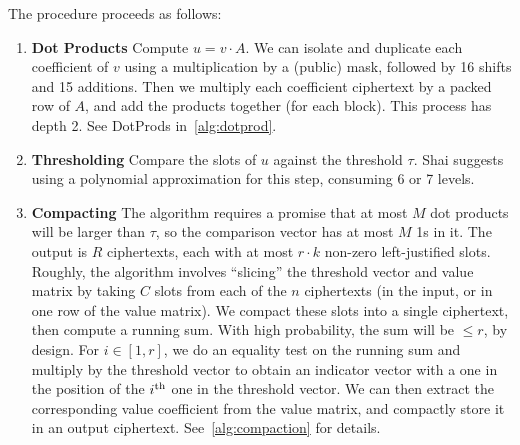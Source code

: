 \documentclass{article}
\begin{document}
	The procedure proceeds as follows:
	\begin{enumerate}
		\item \textbf{Dot Products} Compute $u=v\cdot A$. We can isolate and duplicate each coefficient of $v$ using a multiplication by a (public) mask, followed by 16 shifts and 15 additions. Then we multiply each coefficient ciphertext by a packed row of $A$, and add the products together (for each block). This process has depth 2. See \textrm{DotProds} in~\cref{alg:dotprod}.
		
		\item \textbf{Thresholding} Compare the slots of $u$ against the threshold $\tau$. Shai suggests using a polynomial approximation for this step, consuming 6 or 7 levels.
		
		\item \textbf{Compacting} The algorithm requires a promise that at most $M$ dot products will be larger than $\tau$, so the comparison vector has at most $M$ 1s in it. The output is $R$ ciphertexts, each with at most $r\cdot k$ non-zero left-justified slots. Roughly, the algorithm involves ``slicing'' the threshold vector and value matrix by taking $C$ slots from each of the $n$ ciphertexts (in the input, or in one row of the value matrix). We compact these slots into a single ciphertext, then compute a running sum. With high probability, the sum will be $\le r$, by design. For $i\in[1, r]$, we do an equality test on the running sum and multiply by the threshold vector to obtain an indicator vector with a one in the position of the $i^{\mathrm{th}}$ one in the threshold vector. We can then extract the corresponding value coefficient from the value matrix, and compactly store it in an output ciphertext. See~\cref{alg:compaction} for details.
		
	\end{enumerate} 
	
\end{document}
